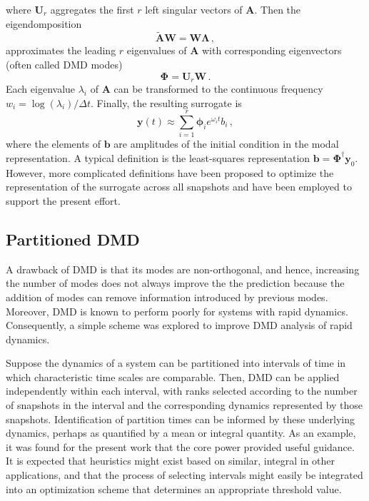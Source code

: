 \documentclass{anstrans}
\renewcommand{\vec}[1]{\bm{#1}} %
\begin{document}
where $\mathbf{U}_r$ aggregates the first $r$  left singular vectors of $\mathbf{A}$.  Then the eigendomposition
\begin{equation}
 \mathbf{\tilde{A}}\mathbf{W} = \mathbf{W}\bm{\Lambda} \, ,
\end{equation}
approximates the leading $r$ eigenvalues of $\mathbf{A}$ with corresponding 
eigenvectors (often called DMD modes)
\begin{equation}
 \bm{\Phi} = \mathbf{U}_r \mathbf{W} \, .
\end{equation}
Each eigenvalue $\lambda_i$ of $\mathbf{A}$ can be transformed to the continuous frequency $w_i=\log(\lambda_i)/\Delta t$.
Finally, the resulting surrogate is
\begin{equation}
 \mathbf{y}(t) \approx \sum^r_{i=1} \bm{\phi}_i e^{\omega_i t} b_i \, ,
\end{equation}
where the elements of $\mathbf{b}$ are amplitudes of the initial condition in the modal representation.  A typical definition is 
the least-squares representation $\mathbf{b}=\bm{\Phi}^{\dagger} \mathbf{y}_0$.  However, more complicated definitions have been proposed to optimize the representation of the surrogate across all snapshots \cite{jovanovic2014sparsity} and have been employed to support the present effort.



\subsection{Partitioned DMD}


A drawback of DMD is that its modes are non-orthogonal, and hence, increasing the number of modes does not always improve the the prediction because the addition of modes can remove information introduced by previous modes.
Moreover, DMD is known to perform poorly for systems with rapid dynamics.  
Consequently, a simple scheme was explored to improve DMD analysis of rapid dynamics.

Suppose the dynamics of a system can be partitioned into intervals of time in which characteristic time scales are comparable.
Then, DMD can be applied independently within each interval, with ranks selected according to the number of snapshots in the interval and the corresponding dynamics represented by those snapshots.
Identification of partition times can be informed by these underlying dynamics, perhaps as quantified by a mean or integral quantity. 
As an example, it was found for the present work that the core power provided useful guidance.
It is expected that heuristics might exist based on similar, integral in other applications, and that the process of selecting intervals might easily be integrated into an optimization scheme that determines an appropriate threshold value.
\end{document}
